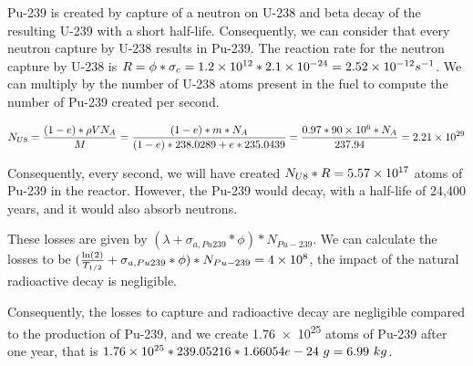 Pu-239 is created by capture of a neutron on U-238 and beta decay of the resulting U-239 with a short half-life. Consequently, we can consider that every neutron capture by U-238 results in Pu-239. The reaction rate for the neutron capture by U-238 is $R = \phi * \sigma_c = \text{\num{1.2e12}} * \text{\num{2.1e-24}} = \text{\num{2.52e-12}} s^{-1}$. We can multiply by the number of U-238 atoms present in the fuel to compute the number of Pu-239 created per second.

\begin{equation}
N_{U8} = \frac{(1-e)*\rho V N_A}{M} = \frac{(1-e)* m * N_A}{(1-e)*238.0289 + e*235.0439} = \frac{0.97 * \text{\num{90e6}} * N_A}{237.94} = \text{\num{2.21e29}}
\end{equation}

Consequently, every second, we will have created $N_{U8} * R = \text{\num{5.57e17}}$ atoms of Pu-239 in the reactor. However, the Pu-239 would decay, with a half-life of 24,400 years, and it would also absorb neutrons.

These losses are given by $(\lambda + \sigma_{a, Pu239}*\phi) * N_{Pu-239}$. We can calculate the losses to be $(\frac{\ln(2)}{T_{1/2}} + \sigma_{a, Pu239}*\phi) * N_{Pu-239} = \text{\num{4e8}}$, the impact of the natural radioactive decay is negligible.

Consequently, the losses to capture and radioactive decay are negligible compared to the production of Pu-239, and we create \num{1.76e25} atoms of Pu-239 after one year, that is $\text{\num{1.76e25}} * 239.05216 * 1.66054e-24\ g = 6.99\ kg$.
